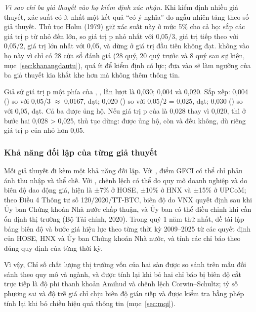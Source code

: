 \begin{vidao}
\emph{Vì sao chỉ ba giả thuyết vào họ kiểm định xác nhận.} Khi kiểm định nhiều giả thuyết, xác suất có ít nhất một kết quả \enquote{có ý nghĩa} do ngẫu nhiên tăng theo số giả thuyết. Thủ tục Holm (1979) giữ xác suất này ở mức 5\% cho cả họ: sắp các giá trị p từ nhỏ đến lớn, so giá trị p nhỏ nhất với 0,05/3, giá trị tiếp theo với 0,05/2, giá trị lớn nhất với 0,05, và dừng ở giá trị đầu tiên không đạt.  không vào họ này vì chỉ có 28 cửa sổ đánh giá (28 quý, 20 quý trước và 8 quý sau sự kiện, mục~\ref{sec:khanangdautu}), quá ít để kiểm định có lực; đưa vào sẽ làm ngưỡng của ba giả thuyết kia khắt khe hơn mà không thêm thông tin.
\end{vidao}

\begin{vidu}
Giả sử giá trị p một phía của , ,  lần lượt là 0,030; 0,004 và 0,020. Sắp xếp: 0,004 () so với 0,05/3 $\approx$ 0,0167, đạt; 0,020 () so với 0,05/2 = 0,025, đạt; 0,030 () so với 0,05, đạt. Cả ba được ủng hộ. Nếu giá trị p của  là 0,028 thay vì 0,020, thì ở bước hai 0,028 > 0,025, thủ tục dừng:  được ủng hộ, còn  và  đều không, dù riêng giá trị p của  nhỏ hơn 0,05.
\end{vidu}

\subsubsection*{Khả năng đối lập của từng giả thuyết}

Mỗi giả thuyết đi kèm một khả năng đối lập. Với , điểm GFCI có thể chỉ phản ánh thu nhập và thể chế. Với , chênh lệch có thể do quy mô doanh nghiệp và do biên độ dao động giá, hiện là ±7\% ở HOSE, ±10\% ở HNX và ±15\% ở UPCoM; theo Điều 4 Thông tư số 120/2020/TT-BTC, biên độ do VNX quyết định sau khi Ủy ban Chứng khoán Nhà nước chấp thuận, và Ủy ban có thể điều chỉnh khi cần ổn định thị trường (Bộ Tài chính, 2020). Trong quý 1 năm thứ nhất, đề tài lập bảng biên độ và bước giá hiệu lực theo từng thời kỳ 2009--2025 từ các quyết định của HOSE, HNX và Ủy ban Chứng khoán Nhà nước, và tính các chỉ báo theo đúng quy định của từng thời kỳ.

Vì vậy, Chỉ số chất lượng thị trường vốn của hai sàn được so sánh trên mẫu đối sánh theo quy mô và ngành, và được tính lại khi bỏ hai chỉ báo bị biên độ cắt trực tiếp là độ phi thanh khoản Amihud và chênh lệch Corwin--Schultz; tỷ số phương sai và độ trễ giá chỉ chịu biên độ gián tiếp và được kiểm tra bằng phép tính lại khi bỏ chiều hiệu quả thông tin (mục~\ref{sec:mqi}).

